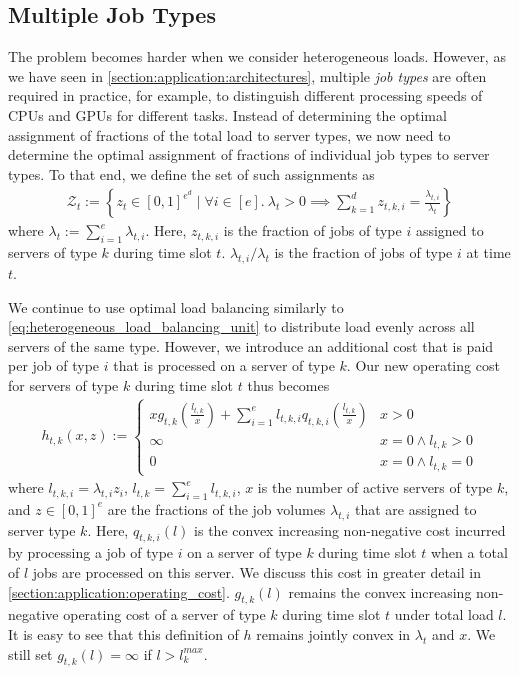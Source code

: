 \subsection{Multiple Job Types}\label{section:application:dispatching:multiple_load_types}

The problem becomes harder when we consider heterogeneous loads. However, as we have seen in \cref{section:application:architectures}, multiple \emph{job types} are often required in practice, for example, to distinguish different processing speeds of CPUs and GPUs for different tasks. Instead of determining the optimal assignment of fractions of the total load to server types, we now need to determine the optimal assignment of fractions of individual job types to server types. To that end, we define the set of such assignments as \begin{align*}
    \mathcal{Z}_t := \left\{z_t \in [0,1]^{e^d} \mid \forall i \in [e].\ \lambda_t > 0 \implies \sum_{k=1}^d z_{t,k,i} = \frac{\lambda_{t,i}}{\lambda_t}\right\}
\end{align*} where $\lambda_t := \sum_{i=1}^e \lambda_{t,i}$. Here, $z_{t,k,i}$ is the fraction of jobs of type $i$ assigned to servers of type $k$ during time slot $t$. $\lambda_{t,i} / \lambda_t$ is the fraction of jobs of type $i$ at time $t$.

We continue to use optimal load balancing similarly to \cref{eq:heterogeneous_load_balancing_unit} to distribute load evenly across all servers of the same type. However, we introduce an additional cost that is paid per job of type $i$ that is processed on a server of type $k$. Our new operating cost for servers of type $k$ during time slot $t$ thus becomes \begin{align}\label{eq:multiple_load_types_load_balancing_unit}
    h_{t,k}(x,z) := \begin{cases} 
        x g_{t,k}\left(\frac{l_{t,k}}{x}\right) + \sum_{i=1}^e l_{t,k,i} q_{t,k,i}\left(\frac{l_{t,k}}{x}\right) & x > 0 \\
        \infty                                                                                                   & x = 0 \land l_{t,k} > 0 \\
        0                                                                                                        & x = 0 \land l_{t,k} = 0
    \end{cases}
\end{align} where $l_{t,k,i} = \lambda_{t,i} z_i$, $l_{t,k} = \sum_{i=1}^e l_{t,k,i}$, $x$ is the number of active servers of type $k$, and $z \in [0,1]^e$ are the fractions of the job volumes $\lambda_{t,i}$ that are assigned to server type $k$. Here, $q_{t,k,i}(l)$ is the convex increasing non-negative cost incurred by processing a job of type $i$ on a server of type $k$ during time slot $t$ when a total of $l$ jobs are processed on this server. We discuss this cost in greater detail in \cref{section:application:operating_cost}. $g_{t,k}(l)$ remains the convex increasing non-negative operating cost of a server of type $k$ during time slot $t$ under total load $l$. It is easy to see that this definition of $h$ remains jointly convex in $\lambda_t$ and $x$. We still set $g_{t,k}(l) = \infty$ if $l > l_k^{max}$.

